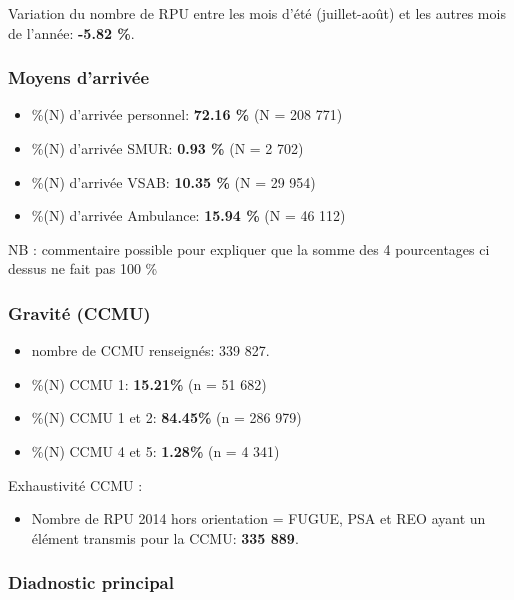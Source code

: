 \documentclass[]{article}
\begin{document}
Variation du nombre de RPU entre les mois d'été (juillet-août) et les
autres mois de l'année: \textbf{-5.82 \%}.

\subsubsection{Moyens d'arrivée}\label{moyens-darrivee}

\begin{itemize}
\itemsep1pt\parskip0pt
\item
  \%(N) d'arrivée personnel: \textbf{72.16 \%} (N = 208 771)
\item
  \%(N) d'arrivée SMUR: \textbf{0.93 \%} (N = 2 702)
\item
  \%(N) d'arrivée VSAB: \textbf{10.35 \%} (N = 29 954)
\item
  \%(N) d'arrivée Ambulance: \textbf{15.94 \%} (N = 46 112)
\end{itemize}

NB : commentaire possible pour expliquer que la somme des 4 pourcentages
ci dessus ne fait pas 100 \%

\subsubsection{Gravité (CCMU)}\label{gravite-ccmu}

\begin{itemize}
\itemsep1pt\parskip0pt
\item
  nombre de CCMU renseignés: 339 827.
\item
  \%(N) CCMU 1: \textbf{15.21\%} (n = 51 682)
\item
  \%(N) CCMU 1 et 2: \textbf{84.45\%} (n = 286 979)
\item
  \%(N) CCMU 4 et 5: \textbf{1.28\%} (n = 4 341)
\end{itemize}

Exhaustivité CCMU :

\begin{itemize}
\itemsep1pt\parskip0pt
\item
  Nombre de RPU 2014 hors orientation = FUGUE, PSA et REO ayant un
  élément transmis pour la CCMU: \textbf{335 889}.
\end{itemize}

\subsubsection{Diadnostic principal}\label{diadnostic-principal}
\end{document}
